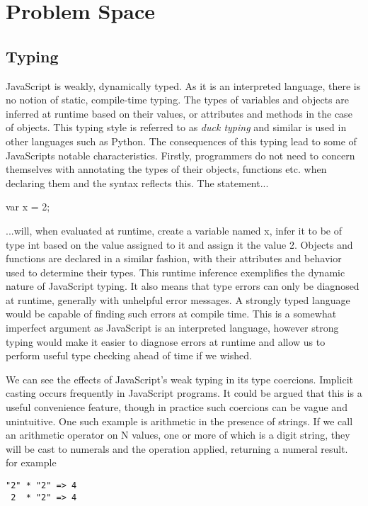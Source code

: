 \section{Problem Space}

\subsection{Typing}
JavaScript is weakly, dynamically typed. As it is an interpreted language,
there is no notion of static, compile-time typing. The types of variables
and objects are inferred at runtime based on their values, or attributes and
methods in the case of objects. This typing style is referred to as\emph{
duck typing} and similar is used in other languages such as Python. The
consequences of this typing lead to some of JavaScripts notable characteristics.
Firstly, programmers do not need to concern themselves with annotating the
types of their objects, functions etc. when declaring them and the syntax
reflects this. The statement...
\begin{center}
var x = 2;		
\end{center}
\noindent ...will, when evaluated at runtime, create a variable named x, infer
it to be of type int based on the value assigned to it and assign it the
value 2. Objects and functions are declared in a similar fashion, with their
attributes and behavior used to determine their types. This runtime inference
exemplifies the dynamic nature of JavaScript typing. It also means that
type errors can only be diagnosed at runtime, generally with unhelpful 
error messages. A strongly typed language would be capable of finding such
errors at compile time. This is a somewhat imperfect argument as JavaScript
is an interpreted language, however strong typing would make it easier to
diagnose errors at runtime and allow us to perform useful type checking
ahead of time if we wished.

We can see the effects of JavaScript's weak typing in its type coercions. 
Implicit casting occurs frequently in JavaScript programs. It could be argued
that this is a useful convenience feature, though in practice such coercions
can be vague and unintuitive. One such example is arithmetic in the presence
of strings. If we call an arithmetic operator on N values,
one or more of which is a digit string, they will be cast to numerals and
the operation applied, returning a numeral result. for example

\begin{center}
	\verb!"2" * "2" => 4! \\
	\verb! 2  * "2" => 4!
\end{center}

